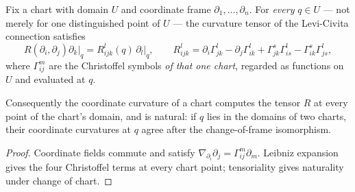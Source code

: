 \begin{lemma}
  \label{lem:pet-ch6-offdiagonal-curvature-bridge}
  \leanok
  Fix a chart with domain $U$ and coordinate frame $\partial_1,\dots,\partial_n$.
  For \emph{every} $q\in U$ — not merely for one distinguished point of $U$ — the
  curvature tensor of the Levi-Civita connection satisfies
  \[
    R(\partial_i,\partial_j)\partial_k\big|_q=R^l_{ijk}(q)\,\partial_l\big|_q,
    \qquad
    R^l_{ijk}=\partial_i\Gamma^l_{jk}-\partial_j\Gamma^l_{ik}
      +\Gamma^s_{jk}\Gamma^l_{is}-\Gamma^s_{ik}\Gamma^l_{js},
  \]
  where $\Gamma^m_{ij}$ are the Christoffel symbols \emph{of that one chart},
  regarded as functions on $U$ and evaluated at $q$.

  Consequently the coordinate curvature of a chart computes the tensor $R$ at every
  point of the chart's domain, and is natural: if $q$ lies in the domains of two
  charts, their coordinate curvatures at $q$ agree after the change-of-frame
  isomorphism.
\end{lemma}
\begin{proof}
  \leanok
  \sketch
  Coordinate fields commute and satisfy \(\nabla_{\partial_i}\partial_j=\Gamma^m_{ij}\partial_m\). Leibniz expansion gives the four Christoffel terms at every chart point; tensoriality gives naturality under change of chart.
\end{proof}

